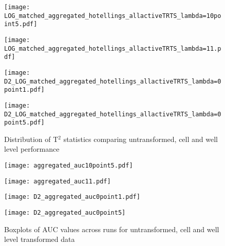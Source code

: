 \documentclass[11pt]{article}
\begin{document}
\begin{figure}[ht!]
\begin{minipage}{.425\textwidth}
\centering
\texttt{[image: LOG\_matched\_aggregated\_hotellings\_allactiveTRTS\_lambda=10point5.pdf]}
\end{minipage}
\begin{minipage}{.425\textwidth}
\centering
\texttt{[image: LOG\_matched\_aggregated\_hotellings\_allactiveTRTS\_lambda=11.pdf]}
\end{minipage}

\begin{minipage}{.425\textwidth}
\centering
\texttt{[image: D2\_LOG\_matched\_aggregated\_hotellings\_allactiveTRTS\_lambda=0point1.pdf]}
\end{minipage}
\begin{minipage}{.425\textwidth}
\centering
\texttt{[image: D2\_LOG\_matched\_aggregated\_hotellings\_allactiveTRTS\_lambda=0point5.pdf]}
\end{minipage}
\caption{Distribution of T$^2$ statistics comparing untransformed, cell and well level performance}
\label{distt10501_agg}
\end{figure}

\clearpage
\begin{figure}[ht!] %
\centering
\begin{minipage}{.495\textwidth}
\centering
\texttt{[image: aggregated\_auc10point5.pdf]}
\end{minipage}
\begin{minipage}{.495\textwidth}
\centering
\texttt{[image: aggregated\_auc11.pdf]}
\end{minipage}

\begin{minipage}{.495\textwidth}
\centering
\texttt{[image: D2\_aggregated\_auc0point1.pdf]}
\end{minipage}
\begin{minipage}{.495\textwidth}
\centering
\texttt{[image: D2\_aggregated\_auc0point5]}
\end{minipage}
\caption{Boxplots of AUC values across runs for untransformed, cell and well level transformed data}
\label{agg_allbox}
\end{figure}
\end{document}
